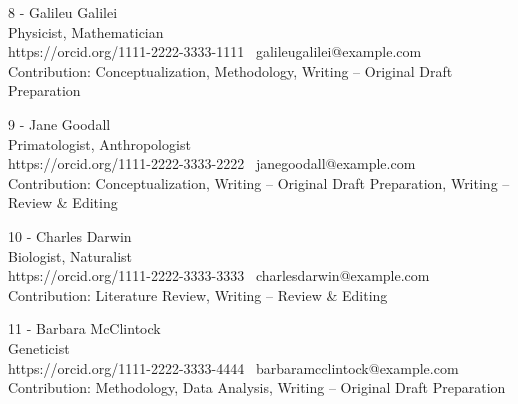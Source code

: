8 - Galileu Galilei\\
Physicist, Mathematician\\
https://orcid.org/1111-2222-3333-1111 \custombullet~galileugalilei@example.com\\
Contribution: Conceptualization, Methodology, Writing – Original Draft Preparation

9 - Jane Goodall\\
Primatologist, Anthropologist\\
https://orcid.org/1111-2222-3333-2222 \custombullet~janegoodall@example.com\\
Contribution: Conceptualization, Writing – Original Draft Preparation, Writing – Review \& Editing

10 - Charles Darwin\\
Biologist, Naturalist\\
https://orcid.org/1111-2222-3333-3333 \custombullet~charlesdarwin@example.com\\
Contribution: Literature Review, Writing – Review \& Editing

11 - Barbara McClintock\\
Geneticist\\
https://orcid.org/1111-2222-3333-4444 \custombullet~barbaramcclintock@example.com\\
Contribution: Methodology, Data Analysis, Writing – Original Draft Preparation
